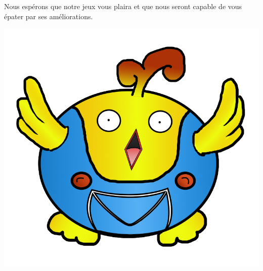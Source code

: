 \documentclass [11pt]{report}
\begin{document}
Nous espérons que notre jeux vous plaira et que nous seront capable de vous épater par ses améliorations.\\


\vspace{10mm}
		
		\begin{center}
		\includegraphics[scale=1.3]{images/birdfin.png}
		\end{center}
\end{document}
